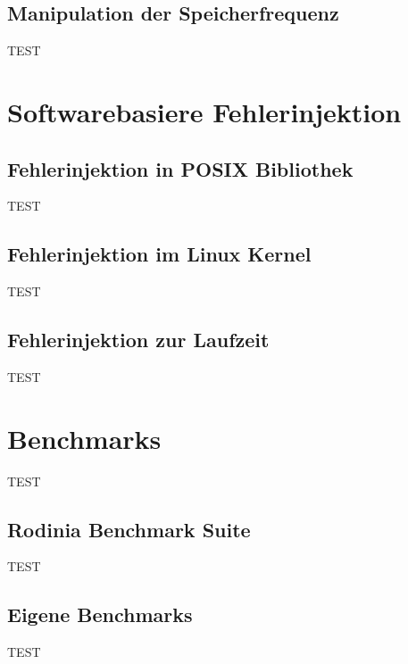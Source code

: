 \subsection{Manipulation der Speicherfrequenz}
TEST

\section{Softwarebasiere Fehlerinjektion}

\subsection{Fehlerinjektion in POSIX Bibliothek}
TEST
\subsection{Fehlerinjektion im Linux Kernel}
TEST

\subsection{Fehlerinjektion zur Laufzeit}
TEST

\section{Benchmarks}
TEST


\subsection{Rodinia Benchmark Suite}
TEST


\subsection{Eigene Benchmarks}
TEST
